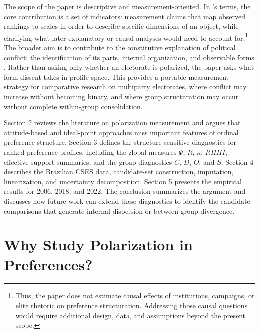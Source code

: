 \documentclass[12pt]{article}
\begin{document}
The scope of the paper is descriptive and measurement-oriented. In \textcite{gerring12_mere_descr}'s terms, the core contribution is a set of indicators: measurement claims that map observed rankings to scales in order to describe specific dimensions of an object, while clarifying what later explanatory or causal analyses would need to account for.\footnote{Thus, the paper does not estimate causal effects of institutions, campaigns, or elite rhetoric on preference structuration. Addressing those causal questions would require additional design, data, and assumptions beyond the present scope.} The broader aim is to contribute to the constitutive explanation of political conflict: the identification of its parts, internal organization, and observable forms \parencite{dowding25_explan_plural_polit_scien}. Rather than asking only whether an electorate is polarized, the paper asks what form dissent takes in profile space. This provides a portable measurement strategy for comparative research on multiparty electorates, where conflict may increase without becoming binary, and where group structuration may occur without complete within-group consolidation.

Section 2 reviews the literature on polarization measurement and argues that attitude-based and ideal-point approaches miss important features of ordinal preference structure. Section 3 defines the structure-sensitive diagnostics for ranked-preference profiles, including the global measures \(\Psi\), \(R\), \(\kappa\), \(RHHI\), effective-support summaries, and the group diagnostics \(C\), \(D\), \(O\), and \(S\). Section 4 describes the Brazilian CSES data, candidate-set construction, imputation, linearization, and uncertainty decomposition. Section 5 presents the empirical results for 2006, 2018, and 2022. The conclusion summarizes the argument and discusses how future work can extend these diagnostics to identify the candidate comparisons that generate internal dispersion or between-group divergence.



\section{Why Study Polarization in Preferences?}
\end{document}
